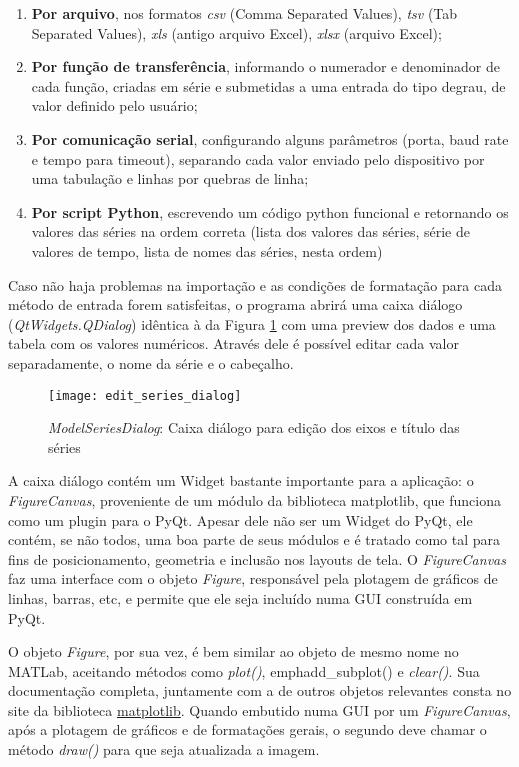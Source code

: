 \begin{enumerate}
	\item \textbf{Por arquivo}, nos formatos \emph{csv} (Comma Separated Values), \emph{tsv} (Tab Separated Values), \emph{xls} (antigo arquivo Excel), \emph{xlsx} (arquivo Excel);
	\item \textbf{Por função de transferência}, informando o numerador e denominador de cada função, criadas em série e submetidas a uma entrada do tipo degrau, de valor definido pelo usuário;
	\item \textbf{Por comunicação serial}, configurando alguns parâmetros (porta, baud rate e tempo para timeout), separando cada valor enviado pelo dispositivo por uma tabulação e linhas por quebras de linha;
	\item \textbf{Por script Python}, escrevendo um código python funcional e retornando os valores das séries na ordem correta (lista dos valores das séries, série de valores de tempo, lista de nomes das séries, nesta ordem)
\end{enumerate}

Caso não haja problemas na importação e as condições de formatação para cada método de entrada forem satisfeitas, o programa abrirá uma caixa diálogo (\emph{QtWidgets.QDialog}) idêntica à da Figura \ref{img_edit_series_dialog} com uma preview dos dados e uma tabela com os valores numéricos. Através dele é possível editar cada valor separadamente, o nome da série e o cabeçalho.

\begin{figure}[hbt]
	\centering
	\texttt{[image: edit\_series\_dialog]}
	\caption{\emph{ModelSeriesDialog}: Caixa diálogo para edição dos eixos e título das séries}
	\label{img_edit_series_dialog}
\end{figure}

A caixa diálogo contém um Widget bastante importante para a aplicação: o \emph{FigureCanvas}, proveniente de um módulo da biblioteca matplotlib, que funciona como um plugin para o PyQt. Apesar dele não ser um Widget do PyQt, ele contém, se não todos, uma boa parte de seus módulos e é tratado como tal para fins de posicionamento, geometria e inclusão nos layouts de tela. O \emph{FigureCanvas} faz uma interface com o objeto \emph{Figure}, responsável pela plotagem de gráficos de linhas, barras, etc, e permite que ele seja incluído numa GUI construída em PyQt.

O objeto \emph{Figure}, por sua vez, é bem similar ao objeto de mesmo nome no MATLab\textsuperscript{\tiny \textregistered}, aceitando métodos como \emph{plot()}, emph{add\_subplot()} e \emph{clear()}. Sua documentação completa, juntamente com a de outros objetos relevantes consta no site da biblioteca \href{https://matplotlib.org/}{matplotlib}. Quando embutido numa GUI por um \emph{FigureCanvas}, após a plotagem de gráficos e de formatações gerais, o segundo deve chamar o método \emph{draw()} para que seja atualizada a imagem.

